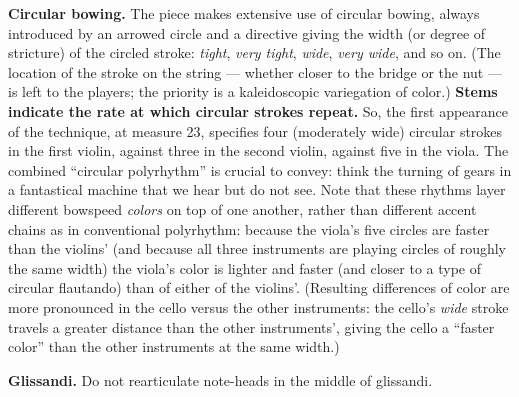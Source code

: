 \textbf{Circular bowing.} The piece makes extensive use of circular bowing, always
introduced by an arrowed circle and a directive giving the width (or degree of stricture)
of the circled stroke: \textit{tight}, \textit{very tight}, \textit{wide}, \textit{very
wide}, and so on. (The location of the stroke on the string --- whether closer to the
bridge or the nut --- is left to the players; the priority is a kaleidoscopic variegation
of color.) \textbf{Stems indicate the rate at which circular strokes repeat.} So, the
first appearance of the technique, at measure 23, specifies four (moderately wide)
circular strokes in the first violin, against three in the second violin, against five in
the viola. The combined ``circular polyrhythm'' is crucial to convey: think the turning
of gears in a fantastical machine that we hear but do not see. Note that these rhythms
layer different bowspeed \textit{colors} on top of one another, rather than different
accent chains as in conventional polyrhythm: because the viola's five circles are faster
than the violins' (and because all three instruments are playing circles of roughly the
same width) the viola's color is lighter and faster (and closer to a type of circular
flautando) than of either of the violins'. (Resulting differences of color are more
pronounced in the cello versus the other instruments: the cello's \textit{wide} stroke
travels a greater distance than the other instruments', giving the cello a ``faster
color'' than the other instruments at the same width.)

\textbf{Glissandi.} Do not rearticulate note-heads in the middle of glissandi.
